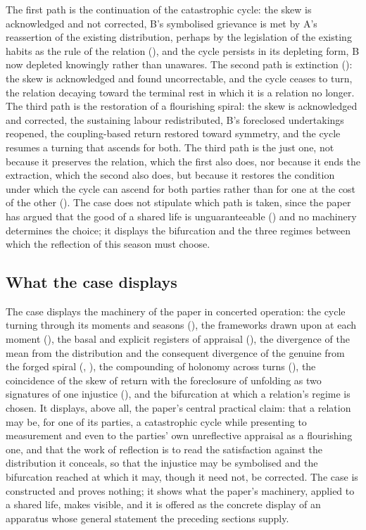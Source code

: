 The first path is the continuation of the catastrophic cycle: the skew is acknowledged and not corrected, B's symbolised grievance is met by A's reassertion of the existing distribution, perhaps by the legislation of the existing habits as the rule of the relation (), and the cycle persists in its depleting form, B now depleted knowingly rather than unawares. The second path is extinction (): the skew is acknowledged and found uncorrectable, and the cycle ceases to turn, the relation decaying toward the terminal rest in which it is a relation no longer. The third path is the restoration of a flourishing spiral: the skew is acknowledged and corrected, the sustaining labour redistributed, B's foreclosed undertakings reopened, the coupling-based return restored toward symmetry, and the cycle resumes a turning that ascends for both. The third path is the just one, not because it preserves the relation, which the first also does, nor because it ends the extraction, which the second also does, but because it restores the condition under which the cycle can ascend for both parties rather than for one at the cost of the other (). The case does not stipulate which path is taken, since the paper has argued that the good of a shared life is unguaranteeable () and no machinery determines the choice; it displays the bifurcation and the three regimes between which the reflection of this season must choose.

\subsection{What the case displays}
\label{p11:sec:case-display}

The case displays the machinery of the paper in concerted operation: the cycle turning through its moments and seasons (), the frameworks drawn upon at each moment (), the basal and explicit registers of appraisal (), the divergence of the mean from the distribution and the consequent divergence of the genuine from the forged spiral (, ), the compounding of holonomy across turns (), the coincidence of the skew of return with the foreclosure of unfolding as two signatures of one injustice (), and the bifurcation at which a relation's regime is chosen. It displays, above all, the paper's central practical claim: that a relation may be, for one of its parties, a catastrophic cycle while presenting to measurement and even to the parties' own unreflective appraisal as a flourishing one, and that the work of reflection is to read the satisfaction against the distribution it conceals, so that the injustice may be symbolised and the bifurcation reached at which it may, though it need not, be corrected. The case is constructed and proves nothing; it shows what the paper's machinery, applied to a shared life, makes visible, and it is offered as the concrete display of an apparatus whose general statement the preceding sections supply.

